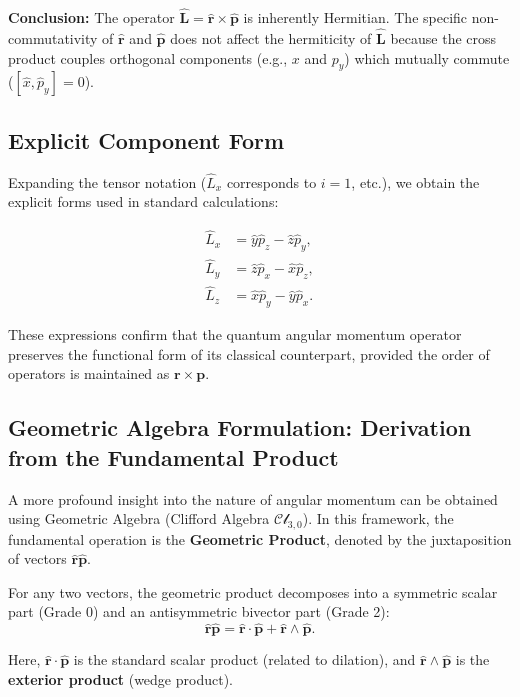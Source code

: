 \textbf{Conclusion:} The operator $\hat{\mathbf{L}} = \hat{\mathbf{r}} \times \hat{\mathbf{p}}$ is inherently Hermitian. The specific non-commutativity of $\hat{\mathbf{r}}$ and $\hat{\mathbf{p}}$ does not affect the hermiticity of $\hat{\mathbf{L}}$ because the cross product couples orthogonal components (e.g., $x$ and $p_y$) which mutually commute ($[\hat{x}, \hat{p}_y] = 0$).

\subsection{Explicit Component Form}

Expanding the tensor notation ($\hat{L}_x$ corresponds to $i=1$, etc.), we obtain the explicit forms used in standard calculations:

\begin{align}
    \hat{L}_x &= \hat{y}\hat{p}_z - \hat{z}\hat{p}_y, \\
    \hat{L}_y &= \hat{z}\hat{p}_x - \hat{x}\hat{p}_z, \\
    \hat{L}_z &= \hat{x}\hat{p}_y - \hat{y}\hat{p}_x.
\end{align}

These expressions confirm that the quantum angular momentum operator preserves the functional form of its classical counterpart, provided the order of operators is maintained as $\mathbf{r} \times \mathbf{p}$.

\subsection{Geometric Algebra Formulation: Derivation from the Fundamental Product}

A more profound insight into the nature of angular momentum can be obtained using Geometric Algebra (Clifford Algebra $\mathcal{Cl}_{3,0}$). In this framework, the fundamental operation is the \textbf{Geometric Product}, denoted by the juxtaposition of vectors $\hat{\mathbf{r}}\hat{\mathbf{p}}$.

For any two vectors, the geometric product decomposes into a symmetric scalar part (Grade 0) and an antisymmetric bivector part (Grade 2):
\begin{equation}
    \hat{\mathbf{r}}\hat{\mathbf{p}} = \hat{\mathbf{r}} \cdot \hat{\mathbf{p}} + \hat{\mathbf{r}} \wedge \hat{\mathbf{p}}.
\end{equation}

Here, $\hat{\mathbf{r}} \cdot \hat{\mathbf{p}}$ is the standard scalar product (related to dilation), and $\hat{\mathbf{r}} \wedge \hat{\mathbf{p}}$ is the \textbf{exterior product} (wedge product).

